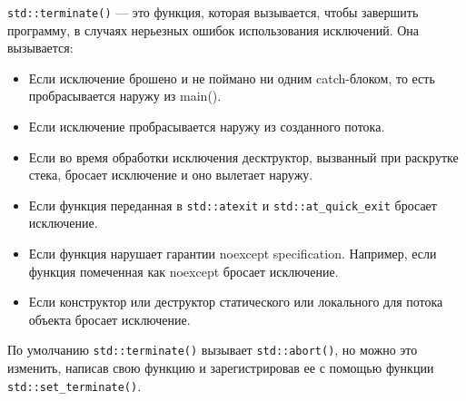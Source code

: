 \texttt{std::terminate()} --- это функция, которая вызывается, чтобы завершить программу, в случаях нерьезных ошибок использования исключений. Она вызывается:
\begin{itemize}
\item Если исключение брошено и не поймано ни одним catch-блоком, то есть пробрасывается наружу из main().
\item Если исключение пробрасывается наружу из созданного потока.
\item Если во время обработки исключения десктруктор, вызванный при раскрутке стека, бросает исключение и оно вылетает наружу.
\item Если функция переданная в \texttt{std::atexit} и \texttt{std::at_quick_exit} бросает исключение.
\item Если функция нарушает гарантии noexcept specification. Например, если функция помеченная как noexcept бросает исключение.
\item Если конструктор или деструктор статического или локального для потока объекта бросает исключение.
\end{itemize}

По умолчанию \texttt{std::terminate()} вызывает \texttt{std::abort()}, но можно это изменить, написав свою функцию и зарегистрировав ее с помощью функции \texttt{std::set_terminate()}.
